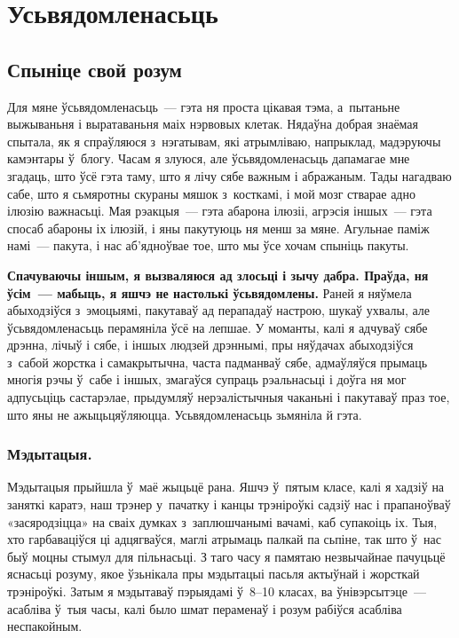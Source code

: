\chapter{Усьвядомленасьць}

\section{Спыніце свой розум}

Для мяне ўсьвядомленасьць~--- гэта ня проста цікавая тэма, а~пытаньне выжываньня і выратаваньня маіх нэрвовых клетак. Нядаўна добрая знаёмая спытала, як я спраўляюся з~нэгатывам, які атрымліваю, напрыклад, мадэруючы камэнтары ў~блогу. Часам я злуюся, але ўсьвядомленасьць дапамагае мне згадаць, што ўсё гэта таму, што я лічу сябе важным і абражаным. Тады нагадваю сабе, што я сьмяротны скураны мяшок з~косткамі, і мой мозг стварае адно ілюзію важнасьці. Мая рэакцыя~--- гэта абарона ілюзіі, агрэсія іншых~--- гэта спосаб абароны іх ілюзій, і яны пакутуюць ня менш за мяне. Агульнае паміж намі~--- пакута, і нас аб'ядноўвае тое, што мы ўсе хочам спыніць пакуты.

\textbf{Спачуваючы іншым, я вызваляюся ад злосьці і зычу дабра. Праўда, ня ўсім~--- мабыць, я яшчэ не настолькі ўсьвядомлены.} Раней я няўмела абыходзіўся з~эмоцыямі, пакутаваў ад перападаў настрою, шукаў ухвалы, але ўсьвядомленасьць перамяніла ўсё на лепшае. У моманты, калі я адчуваў сябе дрэнна, лічыў і сябе, і іншых людзей дрэннымі, пры няўдачах абыходзіўся з~сабой жорстка і самакрытычна, часта падманваў сябе, адмаўляўся прымаць многія рэчы ў~сабе і іншых, змагаўся супраць рэальнасьці і доўга ня мог адпусьціць састарэлае, прыдумляў нерэалістычныя чаканьні і пакутаваў праз тое, што яны не ажыцьцяўляюцца. Усьвядомленасьць зьмяніла й гэта.

\subsection*{Мэдытацыя.}

Мэдытацыя прыйшла ў~маё жыцьцё рана. Яшчэ ў~пятым класе, калі я хадзіў на заняткі каратэ, наш трэнер у~пачатку і канцы трэніроўкі садзіў нас і прапаноўваў «засяродзіцца» на сваіх думках з~заплюшчанымі вачамі, каб супакоіць іх. Тыя, хто гарбаваціўся ці адцягваўся, маглі атрымаць палкай па сьпіне, так што ў~нас быў моцны стымул для пільнасьці. З таго часу я памятаю незвычайнае пачуцьцё яснасьці розуму, якое ўзьнікала пры мэдытацыі пасьля актыўнай і жорсткай трэніроўкі. Затым я мэдытаваў пэрыядамі ў~8--10 класах, ва ўнівэрсытэце~--- асабліва ў~тыя часы, калі было шмат пераменаў і розум рабіўся асабліва неспакойным.

